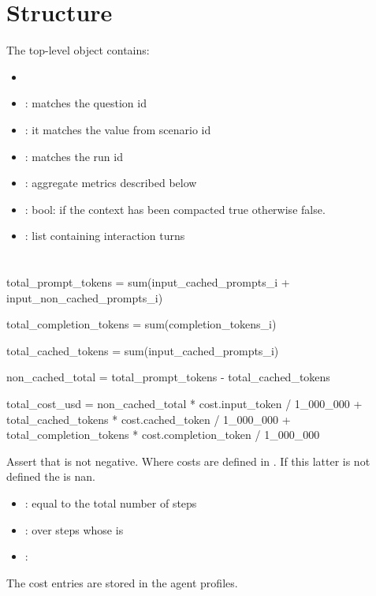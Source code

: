 \documentclass[11pt]{article}
\begin{document}
\section*{\texorpdfstring{}{atif_trajectory.json} Structure}

The top-level object contains:

\begin{itemize}
\item {}
\item {}: matches the question id
\item {}: it matches the value from scenario id
\item {}: matches the run id
\item {}: aggregate metrics described below
\item {}: bool: if the context has been compacted true otherwise false.
\item {}: list containing interaction turns
\end{itemize}


\section*{\texorpdfstring{}{final_metrics}}

\begin{DocCode}
total_prompt_tokens =
  sum(input_cached_prompts_i + input_non_cached_prompts_i)

total_completion_tokens =
  sum(completion_tokens_i)

total_cached_tokens =
  sum(input_cached_prompts_i)

non_cached_total =
  total_prompt_tokens - total_cached_tokens

total_cost_usd =
  non_cached_total * cost.input_token / 1_000_000
  + total_cached_tokens * cost.cached_token / 1_000_000
  + total_completion_tokens * cost.completion_token / 1_000_000
\end{DocCode}

Assert that  is not negative.
Where costs are defined in . If this latter is not defined the  is nan.

\begin{itemize}
\item {}: equal to the total number of steps
\item {}:  over steps whose  is 
\item {}: 
\end{itemize}
The cost entries are stored in the agent profiles.
\end{document}
